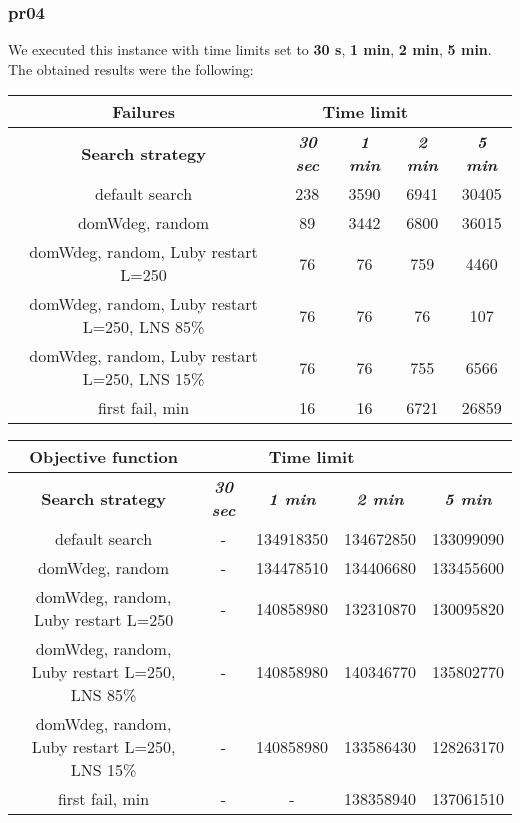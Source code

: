 \subsubsection{pr04}
We executed this instance with time limits set to \textbf{30 s}, \textbf{1 min}, \textbf{2 min}, \textbf{5 min}.\\
The obtained results were the following:
{
\renewcommand{\arraystretch}{2}
\begin{longtable}[h]{| c | c | c | c | c |}
    \hline
    \textbf{Failures} & \multicolumn{3}{c}{Time limit} & \\
    \hline
    \textbf{Search strategy} & \textbf{\textit{30 sec}} & \textbf{\textit{1 min}} & \textbf{\textit{2 min}} & \textbf{\textit{5 min}} \\
    \hline
    \endhead
    default search                                & 238 &  3590 &  6941 &  30405 \\
    \hline
    domWdeg, random                               &  89 &  3442 &  6800 &  36015 \\
    \hline
    domWdeg, random, Luby restart L=250           &  76 &    76 &   759 &   4460 \\
    \hline
    domWdeg, random, Luby restart L=250, LNS 85\% &  76 &    76 &    76 &    107 \\
    \hline
    domWdeg, random, Luby restart L=250, LNS 15\% &  76 &    76 &   755 &   6566 \\
    \hline
    first fail, min                               &  16 &    16 &  6721 &  26859 \\
    \hline
\end{longtable}
}

{
\renewcommand{\arraystretch}{2}
\begin{longtable}[h]{| c | c | c | c | c |}
    \hline
    \textbf{Objective function} & \multicolumn{3}{c}{Time limit} & \\
    \hline
    \textbf{Search strategy} & \textbf{\textit{30 sec}} & \textbf{\textit{1 min}} & \textbf{\textit{2 min}} & \textbf{\textit{5 min}} \\
    \hline
    \endhead
    default search                                &         - & 134918350 & 134672850 & 133099090 \\
    \hline
    domWdeg, random                               &         - & 134478510 & 134406680 & 133455600 \\
    \hline
    domWdeg, random, Luby restart L=250           &         - & 140858980 & 132310870 & 130095820 \\
    \hline
    domWdeg, random, Luby restart L=250, LNS 85\% &         - & 140858980 & 140346770 & 135802770 \\
    \hline
    domWdeg, random, Luby restart L=250, LNS 15\% &         - & 140858980 & 133586430 & 128263170 \\
    \hline
    first fail, min                                &        - &         - & 138358940 & 137061510 \\
    \hline
\end{longtable}
}